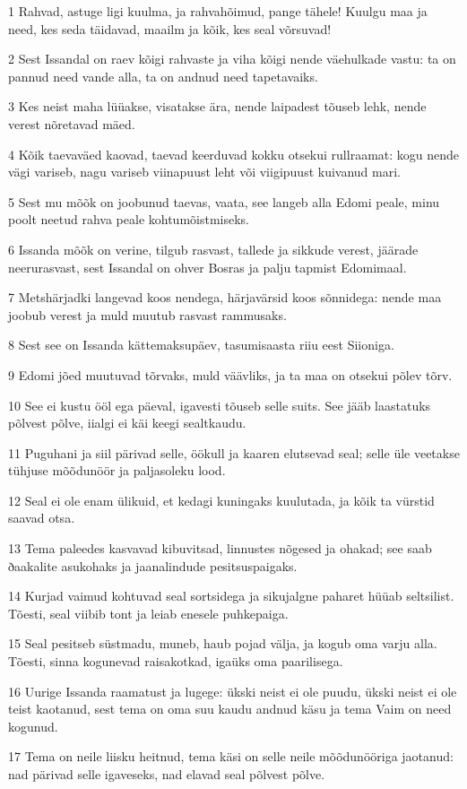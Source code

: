 \par 1 Rahvad, astuge ligi kuulma, ja rahvahõimud, pange tähele! Kuulgu maa ja need, kes seda täidavad, maailm ja kõik, kes seal võrsuvad!
\par 2 Sest Issandal on raev kõigi rahvaste ja viha kõigi nende väehulkade vastu: ta on pannud need vande alla, ta on andnud need tapetavaiks.
\par 3 Kes neist maha lüüakse, visatakse ära, nende laipadest tõuseb lehk, nende verest nõretavad mäed.
\par 4 Kõik taevaväed kaovad, taevad keerduvad kokku otsekui rullraamat: kogu nende vägi variseb, nagu variseb viinapuust leht või viigipuust kuivanud mari.
\par 5 Sest mu mõõk on joobunud taevas, vaata, see langeb alla Edomi peale, minu poolt neetud rahva peale kohtumõistmiseks.
\par 6 Issanda mõõk on verine, tilgub rasvast, tallede ja sikkude verest, jäärade neerurasvast, sest Issandal on ohver Bosras ja palju tapmist Edomimaal.
\par 7 Metshärjadki langevad koos nendega, härjavärsid koos sõnnidega: nende maa joobub verest ja muld muutub rasvast rammusaks.
\par 8 Sest see on Issanda kättemaksupäev, tasumisaasta riiu eest Siioniga.
\par 9 Edomi jõed muutuvad tõrvaks, muld väävliks, ja ta maa on otsekui põlev tõrv.
\par 10 See ei kustu ööl ega päeval, igavesti tõuseb selle suits. See jääb laastatuks põlvest põlve, iialgi ei käi keegi sealtkaudu.
\par 11 Puguhani ja siil pärivad selle, öökull ja kaaren elutsevad seal; selle üle veetakse tühjuse mõõdunöör ja paljasoleku lood.
\par 12 Seal ei ole enam ülikuid, et kedagi kuningaks kuulutada, ja kõik ta vürstid saavad otsa.
\par 13 Tema paleedes kasvavad kibuvitsad, linnustes nõgesed ja ohakad; see saab ðaakalite asukohaks ja jaanalindude pesitsuspaigaks.
\par 14 Kurjad vaimud kohtuvad seal sortsidega ja sikujalgne paharet hüüab seltsilist. Tõesti, seal viibib tont ja leiab enesele puhkepaiga.
\par 15 Seal pesitseb süstmadu, muneb, haub pojad välja, ja kogub oma varju alla. Tõesti, sinna kogunevad raisakotkad, igaüks oma paarilisega.
\par 16 Uurige Issanda raamatust ja lugege: ükski neist ei ole puudu, ükski neist ei ole teist kaotanud, sest tema on oma suu kaudu andnud käsu ja tema Vaim on need kogunud.
\par 17 Tema on neile liisku heitnud, tema käsi on selle neile mõõdunööriga jaotanud: nad pärivad selle igaveseks, nad elavad seal põlvest põlve.

